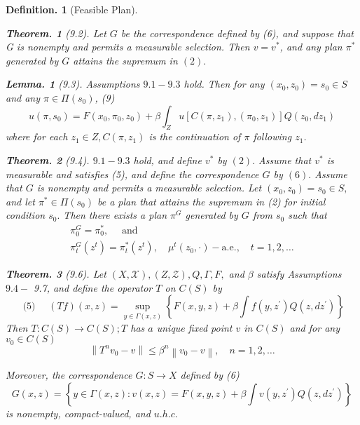\documentclass{article}
\newtheorem{defin}{Definition.}
\newtheorem{teo}{Theorem. }
\newtheorem{lema}{Lemma. }
\theoremstyle{definition}
\begin{document}
\begin{defin}[Feasible Plan]
\begin{teo} [9.2]
Let $G$ be the correspondence defined by (6), and suppose that G is nonempty and permits a measurable selection. Then $v=v^{*}$, and any plan $\pi^{*}$ generated by $G$ attains the supremum in $(2) .$

\end{teo}

\begin{lema}[9.3]
Assumptions $9.1-9.3$ hold. Then for any $\left(x_{0}, z_{0}\right)=s_{0} \in S$ and any $\pi \in \Pi\left(s_{0}\right)$,
(9)
$$
u\left(\pi, s_{0}\right)=F\left(x_{0}, \pi_{0}, z_{0}\right)+\beta \int_{Z} u\left[C\left(\pi, z_{1}\right),\left(\pi_{0}, z_{1}\right)\right] Q\left(z_{0}, d z_{1}\right)
$$
where for each $z_{1} \in Z, C\left(\pi, z_{1}\right)$ is the continuation of $\pi$ following $z_{1}$.
\end{lema}

\begin{teo}[9.4]
$9.1-9.3$ hold, and define $v^{*}$ by $(2) .$ Assume that $v^{*}$ is measurable and satisfies
(5), and define the correspondence $G$ by $(6) .$ Assume that $G$ is nonempty and permits a measurable selection. Let $\left(x_{0}, z_{0}\right)=s_{0} \in S,$ and let $\pi^{*} \in \Pi\left(s_{0}\right)$ be a plan that attains the supremum in (2) for initial condition $s_{0} .$ Then there exists a plan $\pi^{G}$ generated by $G$ from $s_{0}$ such that
$$
\begin{array}{l}
\pi_{0}^{G}=\pi_{0}^{*}, \quad \text { and } \\
\pi_{t}^{G}\left(z^{t}\right)=\pi_{t}^{*}\left(z^{t}\right), \quad \mu^{t}\left(z_{0}, \cdot\right)-\mathrm{a} . \mathrm{e} ., \quad t=1,2, \ldots
\end{array}
$$
\end{teo}



\begin{teo}[9.6] Let $(X, \mathscr{X}),(Z, \mathscr{Z}), Q, \Gamma, F,$ and $\beta$ satisfy Assumptions $9.4-$
9.7, and define the operator $T$ on $C(S)$ by
$$
\text { (5) } \quad(T f)(x, z)=\sup _{y \in \Gamma(x, z)}\left\{F(x, y, z)+\beta \int f\left(y, z^{\prime}\right) Q\left(z, d z^{\prime}\right)\right\}
$$
Then $T: C(S) \rightarrow C(S) ; T$ has $a$ unique fixed point $v$ in $C(S)$ and for any $v_{0} \in C(S)$
$$
\left\|T^{n} v_{0}-v\right\| \leq \beta^{n}\left\|v_{0}-v\right\|, \quad n=1,2, \ldots
$$

Moreover, the correspondence $G: S \rightarrow X$ defined by
(6)
$$
G(x, z)=\left\{y \in \Gamma(x, z): v(x, z)=F(x, y, z)+\beta \int v\left(y, z^{\prime}\right) Q\left(z, d z^{\prime}\right)\right\}
$$
is nonempty, compact-valued, and $u . h . c .$
\end{teo}




\end{defin}
\end{document}
